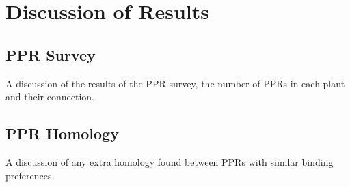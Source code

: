 
\chapter{Discussion of Results} 
\label{chap:results}

\section{PPR Survey}
\label{sec:ppr_survey}

A discussion of the results of the PPR survey, the number of PPRs in each plant
and their connection.

\section{PPR Homology}

A discussion of any extra homology found between PPRs with similar binding
preferences.
